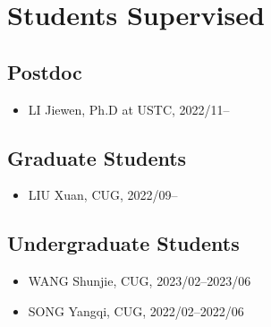 \section{Students Supervised}

\subsection{Postdoc}
\begin{itemize}
\item LI Jiewen, Ph.D at USTC, 2022/11--
\end{itemize}

\subsection{Graduate Students}
\begin{itemize}
\item LIU Xuan, CUG, 2022/09--
\end{itemize}

\subsection{Undergraduate Students}
\begin{itemize}
\item WANG Shunjie, CUG, 2023/02--2023/06
\item SONG Yangqi, CUG, 2022/02--2022/06
\end{itemize}

